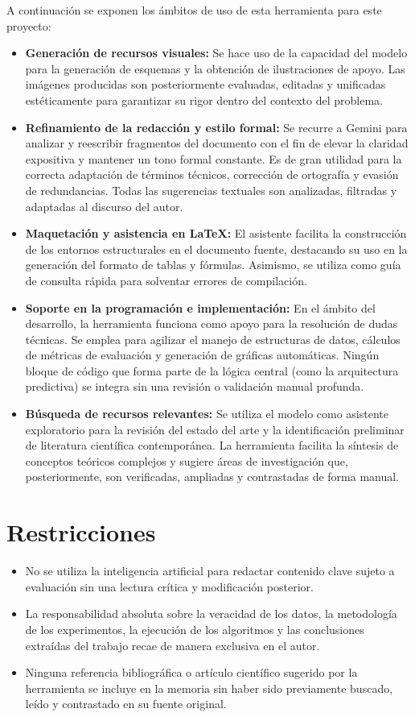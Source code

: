 A continuación se exponen los ámbitos de uso de esta herramienta para este proyecto:
\begin{itemize}
	\item \textbf{Generación de recursos visuales:} Se hace uso de la capacidad del modelo para la generación de esquemas y la obtención de ilustraciones de apoyo. Las imágenes producidas son posteriormente evaluadas, editadas y unificadas estéticamente para garantizar su rigor dentro del contexto del problema.
	\item \textbf{Refinamiento de la redacción y estilo formal:} Se recurre a Gemini para analizar y reescribir fragmentos del documento con el fin de elevar la claridad expositiva y mantener un tono formal constante. Es de gran utilidad para la correcta adaptación de términos técnicos, corrección de ortografía y evasión de redundancias. Todas las sugerencias textuales son analizadas, filtradas y adaptadas al discurso del autor.
	\item \textbf{Maquetación y asistencia en LaTeX:} El asistente facilita la construcción de los entornos estructurales en el documento fuente, destacando su uso en la generación del formato de tablas y fórmulas. Asimismo, se utiliza como guía de consulta rápida para solventar errores de compilación.
	\item \textbf{Soporte en la programación e implementación:} En el ámbito del desarrollo, la herramienta funciona como apoyo para la resolución de dudas técnicas. Se emplea para agilizar el manejo de estructuras de datos, cálculos de métricas de evaluación y generación de gráficas automáticas. Ningún bloque de código que forma parte de la lógica central (como la arquitectura predictiva) se integra sin una revisión o validación manual profunda.
	\item \textbf{Búsqueda de recursos relevantes:} Se utiliza el modelo como asistente exploratorio para la revisión del estado del arte y la identificación preliminar de literatura científica contemporánea. La herramienta facilita la síntesis de conceptos teóricos complejos y sugiere áreas de investigación que, posteriormente, son verificadas, ampliadas y contrastadas de forma manual.
\end{itemize}

\section*{Restricciones}
\begin{itemize}
	\item No se utiliza la inteligencia artificial para redactar contenido clave sujeto a evaluación sin una lectura crítica y modificación posterior.
	\item La responsabilidad absoluta sobre la veracidad de los datos, la metodología de los experimentos, la ejecución de los algoritmos y las conclusiones extraídas del trabajo recae de manera exclusiva en el autor.
	\item Ninguna referencia bibliográfica o artículo científico sugerido por la herramienta se incluye en la memoria sin haber sido previamente buscado, leído y contrastado en su fuente original.
\end{itemize}

